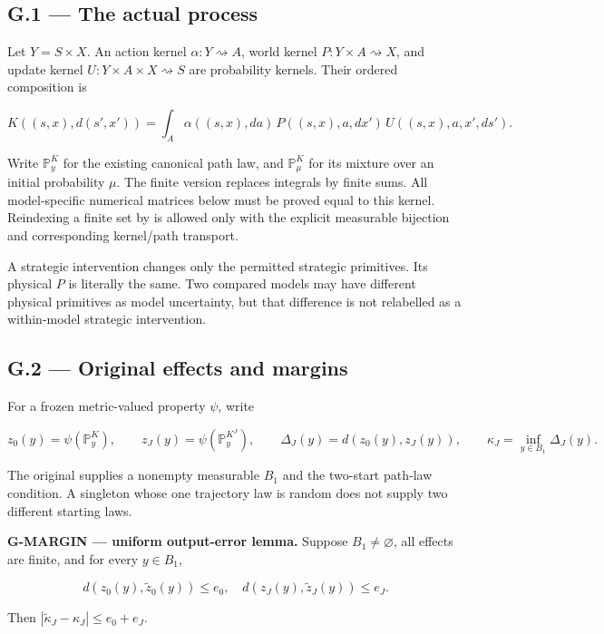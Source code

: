 \documentclass[
  11pt,
  a4paper,
]{article}
\newcommand{\codewrap}[1]{{\ttfamily\seqsplit{#1}}}
\begin{document}
\subsection{G.1 --- The actual process}\label{g.1-the-actual-process}

Let \(Y=S\times X\). An action kernel \(\alpha:Y\rightsquigarrow A\),
world kernel \(P:Y\times A\rightsquigarrow X\), and update kernel
\(U:Y\times A\times X\rightsquigarrow S\) are probability kernels. Their
ordered composition is

\[
K((s,x),d(s',x'))=
\int_A \alpha((s,x),da)\,P((s,x),a,dx')\,U((s,x),a,x',ds').
\]

Write \(\mathbb P_y^K\) for the existing canonical path law, and
\(\mathbb P_\mu^K\) for its mixture over an initial probability \(\mu\).
The finite version replaces integrals by finite sums. All model-specific
numerical matrices below must be proved equal to this kernel. Reindexing
a finite set by \codewrap{Fin\ n} is allowed only with the explicit
measurable bijection and corresponding kernel/path transport.

A strategic intervention changes only the permitted strategic
primitives. Its physical \(P\) is literally the same. Two compared
models may have different physical primitives as model uncertainty, but
that difference is not relabelled as a within-model strategic
intervention.

\subsection{G.2 --- Original effects and
margins}\label{g.2-original-effects-and-margins}

For a frozen metric-valued property \(\psi\), write

\[
z_0(y)=\psi(\mathbb P_y^K),\qquad
z_J(y)=\psi(\mathbb P_y^{K^J}),\qquad
\Delta_J(y)=d(z_0(y),z_J(y)),\qquad
\kappa_J=\inf_{y\in B_1}\Delta_J(y).
\]

The original \codewrap{ConstitutiveComparisonSet} supplies a nonempty
measurable \(B_1\) and the two-start path-law condition. A singleton
whose one trajectory law is random does not supply two different
starting laws.

\textbf{G-MARGIN --- uniform output-error lemma.} Suppose
\(B_1\ne\varnothing\), all effects are finite, and for every
\(y\in B_1\),

\[d(z_0(y),\widetilde z_0(y))\le e_0,
\quad d(z_J(y),\widetilde z_J(y))\le e_J.\]

Then \(|\widetilde\kappa_J-\kappa_J|\le e_0+e_J\).
\end{document}
